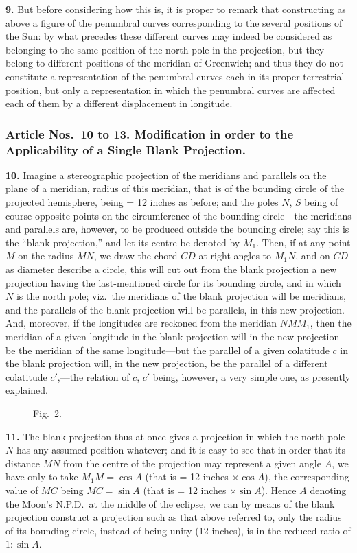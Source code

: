 \documentclass[11pt,a4paper]{article}
\begin{document}
\noindent\textbf{9.} But before considering how this is, it is proper to remark that constructing as above a figure of the penumbral curves corresponding to the several positions of the Sun: by what precedes these different curves may indeed be considered as belonging to the same position of the north pole in the projection, but they belong to different positions of the meridian of Greenwich; and thus they do not constitute a representation of the penumbral curves each in its proper terrestrial position, but only a representation in which the penumbral curves are affected each of them by a different displacement in longitude.

\subsubsection*{Article Nos.\ 10 to 13. Modification in order to the Applicability of a Single Blank Projection.}

\noindent\textbf{10.} Imagine a stereographic projection of the meridians and parallels on the plane of a meridian, radius of this meridian, that is of the bounding circle of the projected hemisphere, being = 12 inches as before; and the poles $N$, $S$ being of course opposite points on the circumference of the bounding circle---the meridians and parallels are, however, to be produced outside the bounding circle; say this is the ``blank projection,'' and let its centre be denoted by $M_{1}$. Then, if at any point $M$ on the radius $MN$, we draw the chord $CD$ at right angles to $M_{1}N$, and on $CD$ as diameter describe a circle, this will cut out from the blank projection a new projection having the last-mentioned circle for its bounding circle, and in which $N$ is the north pole; viz.\ the meridians of the blank projection will be meridians, and the parallels of the blank projection will be parallels, in this new projection. And, moreover, if the longitudes are reckoned from the meridian $NMM_{1}$, then the meridian of a given longitude in the blank projection will in the new projection be the meridian of the same longitude---but the parallel of a given colatitude $c$ in the blank projection will, in the new projection, be the parallel of a different colatitude $c'$,---the relation of $c$, $c'$ being, however, a very simple one, as presently explained.

\begin{figure}[H]
\centering
\caption*{Fig.~2.}
\end{figure}

\noindent\textbf{11.} The blank projection thus at once gives a projection in which the north pole $N$ has any assumed position whatever; and it is easy to see that in order that its distance $MN$ from the centre of the projection may represent a given angle $A$, we have only to take $M_{1}M = \cos A$ (that is = 12 inches $\times \cos A$), the corresponding value of $MC$ being $MC = \sin A$ (that is = 12 inches $\times \sin A$). Hence $A$ denoting the Moon's N.P.D.\ at the middle of the eclipse, we can by means of the blank projection construct a projection such as that above referred to, only the radius of its bounding circle, instead of being unity (12 inches), is in the reduced ratio of $1 : \sin A$.
\end{document}
